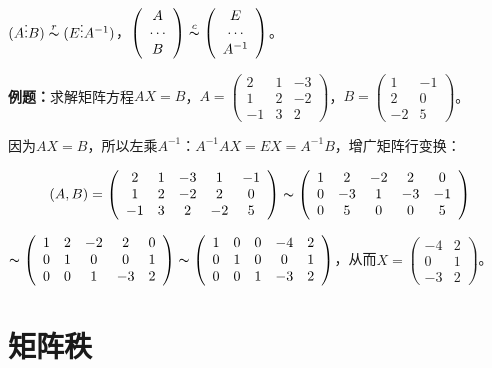 \documentclass[UTF8, 12pt]{ctexart}
\begin{document}
$(A\vdots B)\overset{r}{\thicksim}(E\vdots A^{-1})$，$\left(\begin{array}{c}
    A \\
    \cdots \\
    B
\end{array}\right)\overset{c}{\thicksim}\left(\begin{array}{c}
    E \\
    \cdots \\
    A^{-1}
\end{array}\right)$。

\textbf{例题：}求解矩阵方程$AX=B$，$A=\left(\begin{array}{ccc}
    2 & 1 & -3 \\
    1 & 2 & -2 \\
    -1 & 3 & 2
\end{array}\right)$，$B=\left(\begin{array}{cc}
    1 & -1 \\
    2 & 0 \\
    -2 & 5
\end{array}\right)$。

因为$AX=B$，所以左乘$A^{-1}$：$A^{-1}AX=EX=A^{-1}B$，增广矩阵行变换：

$$(A,B)=\left(\begin{array}{ccccc}
    2 & 1 & -3 & 1 & -1 \\
    1 & 2 & -2 & 2 & 0 \\
    -1 & 3 & 2 & -2 & 5
\end{array}\right)\thicksim\left(\begin{array}{ccccc}
    1 & 2 & -2 & 2 & 0 \\
    0 & -3 & 1 & -3 & -1 \\
    0 & 5 & 0 & 0 & 5
\end{array}\right)$$

$\thicksim\left(\begin{array}{ccccc}
    1 & 2 & -2 & 2 & 0 \\
    0 & 1 & 0 & 0 & 1 \\
    0 & 0 & 1 & -3 & 2
\end{array}\right)\thicksim\left(\begin{array}{ccccc}
    1 & 0 & 0 & -4 & 2 \\
    0 & 1 & 0 & 0 & 1 \\
    0 & 0 & 1 & -3 & 2
\end{array}\right)$，从而$X=\left(\begin{array}{cc}
    -4 & 2 \\
    0 & 1 \\
    -3 & 2
\end{array}\right)$。

\section{矩阵秩}
\end{document}
